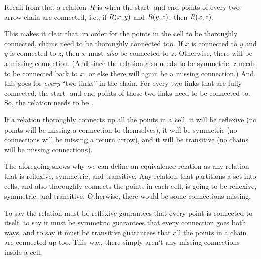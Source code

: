 \documentclass[../../../main.tex]{subfiles}
\begin{document}
\begin{aside}
  \begin{remark}
    Recall from  that a relation $R$ is  when the start- and end-points of every two-arrow chain are connected, i.e., if $R(x, y)$ and $R(y, z)$, then $R(x, z)$.
  \end{remark}
\end{aside}

This makes it clear that, in order for the points in the cell to be thoroughly connected, chains need to be thoroughly connected too. If $x$ is connected to $y$ and $y$ is connected to $z$, then $x$ must \emph{also} be connected to $z$. Otherwise, there will be a missing connection. (And since the relation also needs to be symmetric, $z$ needs to be connected back to $x$, or else there will again be a missing connection.) And, this goes for \emph{every} ``two-links'' in the chain. For every two links that are fully connected, the start- and end-points of those two links need to be connected to. So, the relation needs to be .

\lightrule \vskip 0.5cm

\begin{aside}
  \begin{remark}
    If a relation thoroughly connects up all the points in a cell, it will be reflexive (no points will be missing a connection to themselves), it will be symmetric (no connections will be missing a return arrow), and it will be transitive (no chains will be missing connections).
  \end{remark}
\end{aside}

The aforegoing shows why we can define an equivalence relation as any relation that is reflexive, symmetric, and transitive. Any relation that partitions a set into cells, and also thoroughly connects the points in each cell, is going to be reflexive, symmetric, and transitive. Otherwise, there would be some connections missing. 

To say the relation must be reflexive guarantees that every point is connected to itself, to say it must be symmetric guarantees that every connection goes both ways, and to say it must be transitive guarantees that all the points in a chain are connected up too. This way, there simply aren't any missing connections inside a cell.


\end{document}

